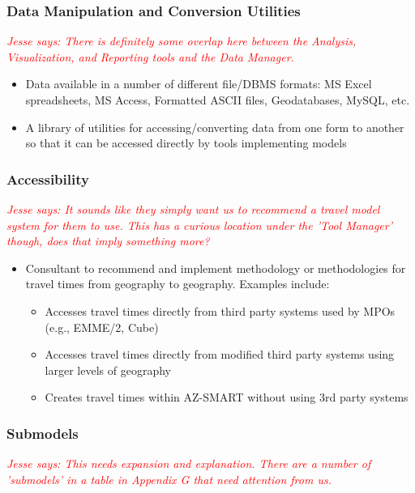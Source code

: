 \documentclass[titlepage]{article}
\begin{document}
\subsubsection{Data Manipulation and Conversion Utilities}
\textcolor{red}{\textit{Jesse says: There is definitely some overlap here between the Analysis, Visualization, and Reporting tools and the Data Manager.}}
\begin{itemize}
	\item Data available in a number of different file/DBMS formats: MS Excel spreadsheets, MS Access, Formatted ASCII files, Geodatabases, MySQL, etc.
	\item A library of utilities for accessing/converting data from one form to another so that it can be accessed directly by tools implementing models
\end{itemize}

\subsubsection{Accessibility}
\textcolor{red}{\textit{Jesse says: It sounds like they simply want us to recommend a travel model system for them to use.  This has a curious location under the 'Tool Manager' though, does that imply something more?}}
\begin{itemize}
	\item Consultant to recommend and implement methodology or methodologies for travel times from geography to geography. Examples include:
		\begin{itemize}
			\item Accesses travel times directly from third party systems used by MPOs (e.g., EMME/2, Cube)
			\item Accesses travel times directly from modified third party systems using larger levels of geography
			\item Creates travel times within AZ-SMART without using 3rd party systems
		\end{itemize}
\end{itemize}

\subsubsection{Submodels}
\textcolor{red}{\textit{Jesse says: This needs expansion and explanation.  There are a number of 'submodels' in a table in Appendix G that need attention from us.}}
\end{document}
